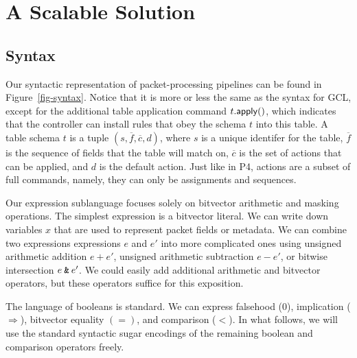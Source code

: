 \section{A Scalable Solution}

\subsection{Syntax}

Our syntactic representation of packet-processing pipelines can be
found in Figure~\ref{fig-syntax}. Notice that it is more or less the
same as the syntax for GCL, except for the additional table
application command $t.\mathsf{apply}()$, which indicates that the controller
can install rules that obey the schema $t$ into this table. A table
schema $t$ is a tuple $(s, \overline f, \overline c, d)$, where $s$ is
a unique identifer for the table, $\overline f$ is the sequence of
fields that the table will match on, $\overline c$ is the set of
actions that can be applied, and $d$ is the default action. Just like
in P4, actions are a subset of full commands, namely, they can only be
assignments and sequences.

Our expression sublanguage focuses solely on bitvector arithmetic and
masking operations. The simplest expression is a bitvector literal. We
can write down variables $x$ that are used to represent packet fields
or metadata. We can combine two expressions expressions $e$ and $e'$
into more complicated ones using unsigned arithmetic addition
$e + e'$, unsigned arithmetic subtraction $e - e'$, or bitwise
intersection $e \mathbin{\texttt{\&}} e'$. We could easily add additional arithmetic
and bitvector operators, but these operators suffice for this
exposition.

The language of booleans is standard. We can express falsehood ($0$),
implication ($\Rightarrow$), bitvector equality $(=)$, and comparison
($<$). In what follows, we will use the standard syntactic sugar
encodings of the remaining boolean and comparison operators freely.

